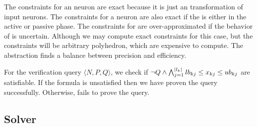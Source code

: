 The constraints for an \affine{} neuron are exact because it is just an \affine{}
transformation of input neurons. 
The constraints for a \relu{} neuron are also exact if the \relu{} is either
in the active or passive phase. 
The constraints for \relu{} are over-approximated if the behavior of \relu{}
is uncertain. Although we may compute exact 
constraints for this case, but the constraints will be arbitrary polyhedron,
which are expensive to compute.
The \deeppoly{} abstraction finds a balance between precision and efficiency.

For the verification query $\langle N, P, Q \rangle$, we check if
$\lnot Q \land \bigwedge_{j=1}^{|l_k|}lb_{kj} \leq x_{kj} \leq ub_{kj}$
are satisfiable.
%
If the formula is unsatisfied then we have proven the query successfully.
Otherwise, \deeppoly{} fails to prove the query.




\subsection{Solver}
\label{sec:solver}


